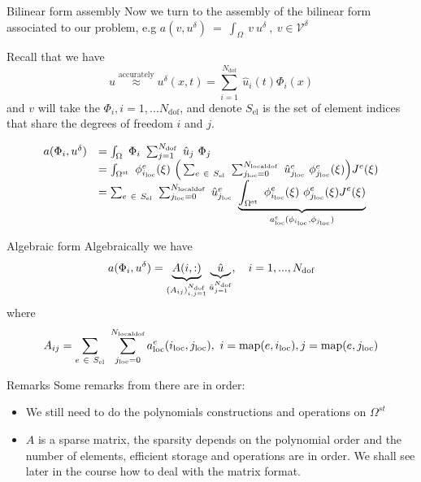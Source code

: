 \begin{frame}{Bilinear form assembly}
  Now we turn to the assembly of the bilinear form associated to our
  problem, e.g $a(v, u^\delta)\ =\ \int_\Omega\ v\ u^\delta\ ,\  v \in \mathcal{V}^\delta$

  Recall that we have
  \begin{equation}
    \label{eq:59}
    u \stackrel{\text{accurately}}{\approx}  u^{\delta }(x, t ) = \sum_{i=1}^{N_{\text{dof}}}\ \hat{u}_i(t) \Phi_i(x)
  \end{equation}
  and $v$ will take the $\Phi_i, i=1,...N_{\text{dof}}$, and denote
  $S_{\text{el}}$ is the set of element indices that share the degrees
  of freedom $i$ and $j$.

  \begin{equation}
    \label{eq:60}
    \begin{array}[c]{rl}
      a(\Phi_i, u^\delta) & = \int_\Omega\ \Phi_i\ \sum_{j=1}^{\ndof}\ \hat{u}_j\ \Phi_j \\
      & = \int_{\Omega^{\text{st}}} \ \phi^e_\iloc(\xi)\ \Big( \sum_{e\ \in\ S_{\text{el}}}\ \sum_{\jloc=0}^{\nldof}\ \hat{u}_\jloc^e\ \phi_\jloc^e(\xi) \Big) J^e(\xi) \\
      & = \sum_{e\ \in\ S_{\text{el}}}\ \sum_{\jloc=0}^{\nldof}\ \hat{u}_\jloc^e\ \underbrace{\int_{\Omega^{\text{st}}} \ \phi^e_\iloc(\xi)\   \phi_\jloc^e(\xi)  J^e(\xi)}_{\aloc{e}(\phi_\iloc, \phi_\jloc)} 
    \end{array}
  \end{equation}
\end{frame}
\begin{frame}{Algebraic form}
  Algebraically we have
  \begin{equation}
    \label{eq:61}
    a(\Phi_i, u^\delta) = \underbrace{A(i,:)}_{(A_{ij})_{i,j=1}^{N_{\text{dof}}} } \underbrace{\hat{u}}_{\hat{u}_{j=1}^{N_\text{dof}}},\quad i = 1,...,{N_{\text{dof}}}
  \end{equation}
  where
  \begin{equation}
    \label{eq:62}
    A_{ij} = \sum_{e\ \in\ S_{\text{el}}}\ \sum_{{j_{\text{loc}}}=0}^{{N_{\text{localdof}}}} {a^{e}_{\text{loc}}}({i_{\text{loc}}},{j_{\text{loc}}}),\ i = \text{map}(e,{i_{\text{loc}}}), j = \text{map}(e,{j_{\text{loc}}})
  \end{equation}
\end{frame}

\begin{frame}{Remarks}
  Some remarks from there are in order:
  \begin{itemize}
  \item We still need to do the polynomials constructions and
    operations on $\Omega^{st}$
  \item $A$ is a sparse matrix, the sparsity depends on the polynomial
    order and the number of elements, efficient storage and operations
    are in order. We shall see later in the course how to deal with
    the matrix format.
  \end{itemize}
\end{frame}

